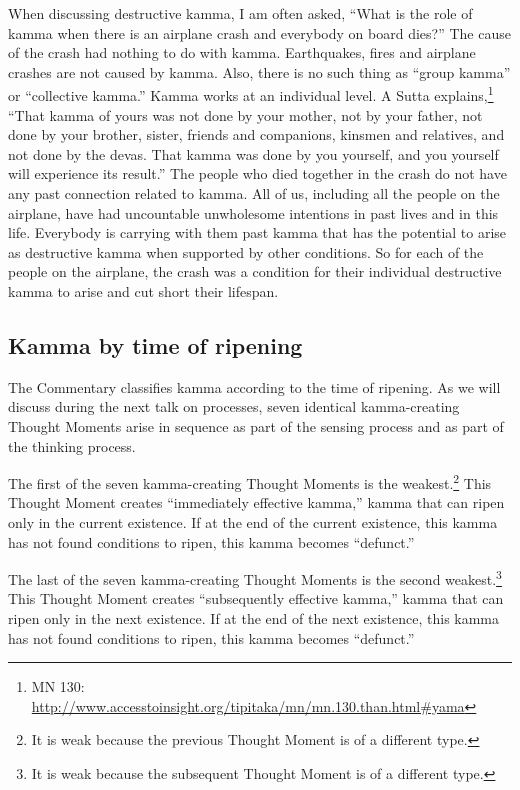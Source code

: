 When discussing destructive kamma, I am often asked, “What is the role of kamma when there is an airplane crash and everybody on board dies?” The cause of the crash had nothing to do with kamma. Earthquakes, fires and airplane crashes are not caused by kamma. Also, there is no such thing as “group kamma” or “collective kamma.” Kamma works at an individual level. A Sutta explains,\footnote{MN 130: \url{http://www.accesstoinsight.org/tipitaka/mn/mn.130.than.html\#yama}} “That kamma of yours was not done by your mother, not by your father, not done by your brother, sister, friends and companions, kinsmen and relatives, and not done by the devas. That kamma was done by you yourself, and you yourself will experience its result.” The people who died together in the crash do not have any past connection related to kamma. All of us, including all the people on the airplane, have had uncountable unwholesome intentions in past lives and in this life. Everybody is carrying with them past kamma that has the potential to arise as destructive kamma when supported by other conditions. So for each of the people on the airplane, the crash was a condition for their individual destructive kamma to arise and cut short their lifespan.

\subsection*{Kamma by time of ripening}

The Commentary classifies kamma according to the time of ripening. As we will discuss during the next talk on processes, seven identical kamma-creating Thought Moments arise in sequence as part of the sensing process and as part of the thinking process.

The first of the seven kamma-creating Thought Moments is the weakest.\footnote{It is weak because the previous Thought Moment is of a different type.} This Thought Moment creates “immediately effective kamma,” kamma that can ripen only in the current existence. If at the end of the current existence, this kamma has not found conditions to ripen, this kamma becomes “defunct.”

The last of the seven kamma-creating Thought Moments is the second weakest.\footnote{It is weak because the subsequent Thought Moment is of a different type.} This Thought Moment creates “subsequently effective kamma,” kamma that can ripen only in the next existence. If at the end of the next existence, this kamma has not found conditions to ripen, this kamma becomes “defunct.”

